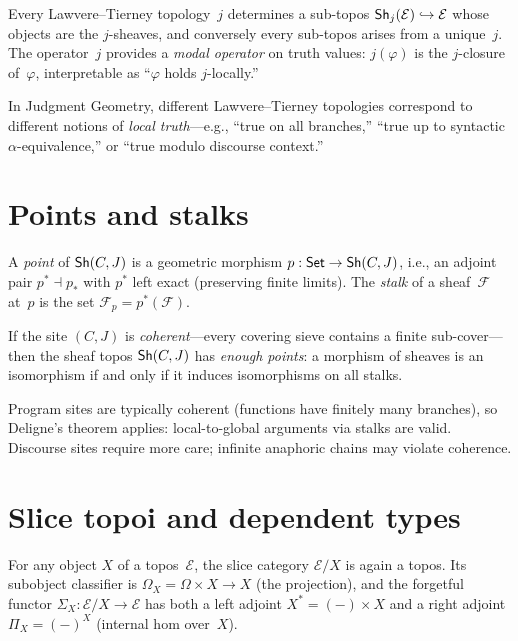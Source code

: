 \begin{proposition}
Every Lawvere--Tierney topology~$j$ determines a sub-topos
$\mathsf{Sh}_j(\mathcal{E}) \hookrightarrow \mathcal{E}$ whose objects are the
$j$-sheaves, and conversely every sub-topos arises from a unique~$j$.
The operator~$j$ provides a \emph{modal operator} on truth values:
$j(\varphi)$ is the $j$-closure of~$\varphi$, interpretable as
``$\varphi$ holds $j$-locally.''
\end{proposition}

In Judgment Geometry, different Lawvere--Tierney topologies correspond to
different notions of \emph{local truth}---e.g., ``true on all
branches,'' ``true up to syntactic $\alpha$-equivalence,'' or ``true
modulo discourse context.''

\section{Points and stalks}

\begin{definition}
\label{def:point}
A \emph{point} of $\mathsf{Sh}(C,J)$ is a geometric morphism
$p : \mathsf{Set} \to \mathsf{Sh}(C,J)$, i.e., an adjoint pair
$p^* \dashv p_*$ with $p^*$ left exact (preserving finite limits).
The \emph{stalk} of a sheaf~$\mathcal{F}$ at~$p$ is the set
$\mathcal{F}_p = p^*(\mathcal{F})$.
\end{definition}

\begin{theorem}[Deligne]
\label{thm:deligne}
If the site $(C,J)$ is \emph{coherent}---every covering sieve
contains a finite sub-cover---then the sheaf topos $\mathsf{Sh}(C,J)$ has
\emph{enough points}: a morphism of sheaves is an isomorphism if and
only if it induces isomorphisms on all stalks.
\end{theorem}

\begin{remark}
Program sites are typically coherent (functions have finitely many
branches), so Deligne's theorem applies: local-to-global arguments via
stalks are valid.  Discourse sites require more care; infinite
anaphoric chains may violate coherence.
\end{remark}

\section{Slice topoi and dependent types}

\begin{theorem}
\label{thm:slice-topos}
For any object $X$ of a topos~$\mathcal{E}$, the slice category
$\mathcal{E}/X$ is again a topos.  Its subobject classifier is
$\Omega_X = \Omega \times X \to X$ (the projection), and the
forgetful functor $\Sigma_X : \mathcal{E}/X \to \mathcal{E}$ has
both a left adjoint $X^* = (-) \times X$ and a right adjoint
$\Pi_X = (-)^X$ (internal hom over~$X$).
\end{theorem}

